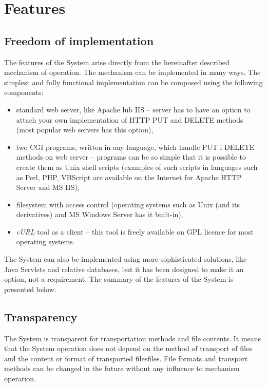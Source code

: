 \documentclass[a4paper]{article}
\begin{document}
\section{Features}

\subsection{Freedom of implementation}

The features of the System arise directly from the hereinafter described mechanism of operation.
The mechanism can be implemented in many ways. The simplest and fully functional implementation 
can be composed using the following components:
\begin{itemize}
  \item standard web server, like Apache lub IIS -- server has to have an option to
  attach your own implementation of HTTP PUT and DELETE methods (most popular web servers
  has this option),
  \item two CGI programs, written in any language, which handle PUT i DELETE methods on
  web server -- programs can be so simple that it is possible to create them as Unix
  shell scripts (examples of such scripts in languages such as Perl, PHP, VBScript are
  available on the Internet for Apache HTTP Server and MS IIS),
  \item filesystem with access control (operating systems such as Unix (and its
  derivatives) and MS Windows Server has it built-in),
  \item \emph{cURL} tool as a client -- this tool is freely available on GPL licence for
  most operating systems.
\end{itemize}

The System can also be implemented using more sophisticated solutions, like Java Servlets
and relative databases, but it has been designed to make it an option, not a requirement. 
The summary of the features of the System is presented below.

\subsection{Transparency}

The System is transparent for transportation methods and file contents. It means that the 
System operation does not depend on the method of transport of files and the content or 
format of transported filesfiles. File formats and transport methods can be changed in 
the future without any influence to mechanism operation.
\end{document}
